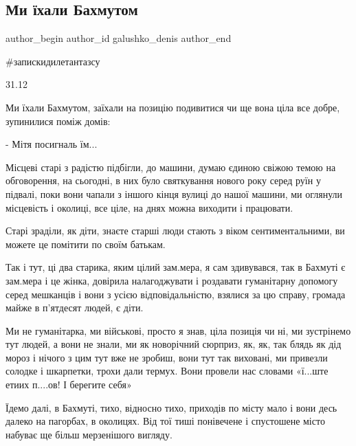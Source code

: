  
 
 
 
 

\subsection{Ми їхали Бахмутом}
\label{sec:01_01_2023.fb.galushko_denis.1.mi__khali_bakhmutom}

\ifcmt
 author_begin
   author_id galushko_denis
 author_end
\fi

\#запискидилетантазсу

31.12

Ми їхали Бахмутом,  заїхали на позицію подивитися чи ще вона ціла все добре,
зупинилися поміж домів:

- Мітя посигналь їм... 

Місцеві старі з радістю підбігли, до машини, думаю єдиною свіжою темою на
обговорення, на сьогодні, в них було святкування нового року серед руїн у
підвалі, поки вони чапали з іншого кінця вулиці до нашої машини, ми оглянули
місцевість і околиці, все ціле, на днях можна виходити і працювати. 

Старі зраділи, як діти, знаєте старші люди стають з віком сентиментальними, ви
можете це помітити по своїм батькам. 

Так і тут, ці два старика, яким цілий зам.мера, я сам здивувався, так в Бахмуті
є зам.мера і це жінка, довірила налагоджувати і роздавати гуманітарну допомогу
серед мешканців і вони з усією відповідальністю, взялися за цю справу, громада
майже в п'ятдесят людей, є діти. 

Ми не гуманітарка, ми військові, просто я знав, ціла позиція чи ні, ми
зустрінемо тут людей, а вони не знали, ми як новорічний сюрприз, як, як, так
блядь як дід мороз і нічого з цим тут вже не зробиш, вони тут так виховані, ми
привезли солодке і шкарпетки, трохи дали термух. Вони провели нас словами
«ї...ште етиих п....ов! І берегите себя»

Їдемо далі, в Бахмуті, тихо, відносно тихо, приходів по місту мало і вони десь
далеко на пагорбах, в околицях.  Від тої тиші понівечене і спустошене місто
набуває ще більш мерзенішого вигляду.

